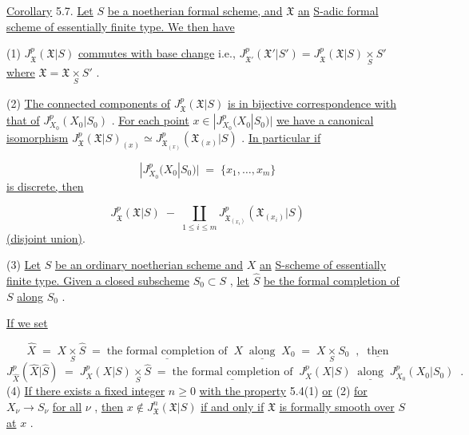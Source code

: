 \underline{Corollary} 5.7. \underline{Let} $S$ \underline{be a noetherian formal scheme, and} $\mathfrak{X}$ \underline{an} \underline{S-adic formal scheme of essentially finite type. We then have}

(1) $J^p_{\mathfrak{X}}(\mathfrak{X}|S)$ \underline{commutes with base change} i.e., $J^p_{\mathfrak{X}'}(\mathfrak{X}'|S') = J^p_{\mathfrak{X}}(\mathfrak{X}|S) \underset{S}{\times} S'$ \underline{where} $\mathfrak{X} = \mathfrak{X} \underset{S}{\times} S'$ .

(2) \underline{The connected components of} $J^p_{\mathfrak{X}}(\mathfrak{X}|S)$ \underline{is in bijective correspondence with that of} $J^p_{X_0}(X_0|S_0)$ . \underline{For each point} $x \in |J^p_{X_0}(X_0|S_0)|$ \underline{we have a canonical isomorphism} $J^p_{\mathfrak{X}}(\mathfrak{X}|S)_{(x)} \simeq J^p_{\mathfrak{X}_{(x)}}(\mathfrak{X}_{(x)}|S)$ . \underline{In particular if}

\begin{equation*}
|J^p_{X_0}(X_0|S_0)| \;=\; \{x_1,\dots,x_m\}
\end{equation*}
\underline{is discrete, then}

\begin{equation*}
J^p_{\mathfrak{X}}(\mathfrak{X}|S) \;-\; \coprod_{1 \leq i \leq m} J^p_{\mathfrak{X}_{(x_i)}}(\mathfrak{X}_{(x_i)}|S)
\end{equation*}
\underline{(disjoint union)}.



(3) \underline{Let} $S$ \underline{be an ordinary noetherian scheme and} $X$ \underline{an} \underline{S-scheme of essentially finite type. Given a closed subscheme} $S_0 \subset S$ , \underline{let} $\widehat{S}$ \underline{be the formal completion of} $S$ \underline{along} $S_0$ .

\underline{If we set}

\begin{equation*}
\widehat{X} \;=\; X \underset{S}{\times} \widehat{S} \;=\; \underline{\text{the formal completion of}}\;\; X \;\; \underline{\text{along}} \;\; X_0 \;=\; X \underset{S}{\times} S_0 \;\;,\;\; \underline{\text{then}}
\end{equation*}
\begin{equation*}
J^{p}_{\widehat{X}}(\widehat{X}|\widehat{S}) \;=\; J^{p}_{X}(X|S) \underset{S}{\times} \widehat{S} \;=\; \underline{\text{the formal completion of}} \;\; J^{p}_{X}(X|S) \;\; \underline{\text{along}} \;\; J^{p}_{X_0}(X_0|S_0) \;\;.
\end{equation*}
(4) \underline{If there exists a fixed integer} $n \geq 0$ \underline{with the property} 5.4(1) \underline{or} (2) \underline{for} $X_\nu \to S_\nu$ \underline{for all} $\nu$ , \underline{then} $x \notin J^{n}_{\mathfrak{X}}(\mathfrak{X}|S)$ \underline{if and only if} $\mathfrak{X}$ \underline{is formally smooth over} $S$ \underline{at} $x$ .

